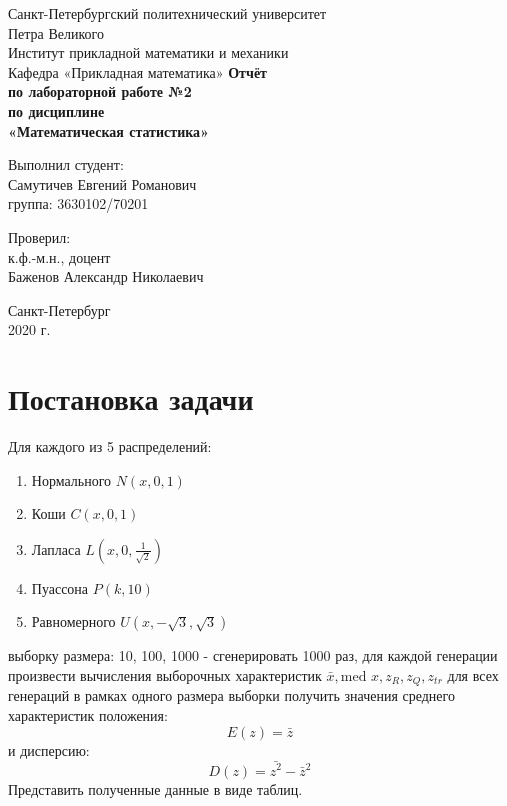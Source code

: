 \documentclass[12pt,a4paper]{article}
\begin{document}
	
\begin{titlepage}
	\begin{center}		
		\vfill	
		Санкт-Петербургский политехнический университет \\
		Петра Великого\\
		\vskip 1cm
		Институт прикладной математики и механики \\
		Кафедра «Прикладная математика»
		\vfill
		\textbf{Отчёт\\
			по лабораторной работе №2\\
			по дисциплине\\
			«Математическая статистика»\\}
		\vfill
	\end{center}
	\vfill
	\hfill
	\begin{minipage}{0.4\textwidth}
		Выполнил студент:\\
		Самутичев Евгений Романович\\
		группа: 3630102/70201\\
	\end{minipage}
	\vfill
	\hfill 
	\begin{minipage}{0.4\textwidth}
		Проверил:\\
		к.ф.-м.н., доцент\\
		Баженов Александр Николаевич\
	\end{minipage}
	\vfill
	\begin{center}
		Санкт-Петербург\\2020 г.
	\end{center}
\end{titlepage}

\tableofcontents
\listoftables
\pagebreak

\section{Постановка задачи}
Для каждого из 5 распределений:

\begin{enumerate}
	\item Нормального $N(x, 0, 1)$
	\item Коши $C(x, 0, 1)$
	\item Лапласа $L(x, 0, \frac{1}{\sqrt{2}})$
	\item Пуассона $P(k, 10)$
	\item Равномерного $U(x, -\sqrt{3}, \sqrt{3})$	
\end{enumerate}

выборку размера: 10, 100, 1000 - сгенерировать 1000 раз, для каждой генерации произвести вычисления выборочных характеристик $\bar x, \text{med }x, z_R, z_Q, z_{tr}$ для всех генераций в рамках одного размера выборки получить значения среднего характеристик положения:
\begin{equation}\label{1}
E(z) = \bar z
\end{equation}
и дисперсию:
\begin{equation}\label{2}
D(z) = \bar {z^2} - {\bar z}^2
\end{equation}
Представить полученные данные в виде таблиц.
\pagebreak
\end{document}

